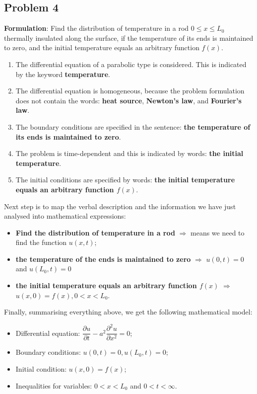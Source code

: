 \subsection{Problem 4}

{\bfseries Formulation}: Find the distribution of temperature in a rod $0\leq x\leq L_{0}$ thermally insulated along the surface, if the temperature of its ends is maintained to zero, and the initial temperature equals an arbitrary function $f(x)$.
\begin{enumerate}
\item The differential equation of a parabolic type is considered. This is indicated by the keyword {\bfseries temperature}.
\item The differential equation is homogeneous, because the problem formulation does not contain the words: {\bfseries heat source}, {\bfseries Newton's law}, and {\bfseries Fourier's law}.
\item The boundary conditions are specified in the sentence: {\bfseries the temperature of its ends is maintained to zero}.
\item The problem is time-dependent and this is indicated by words: {\bfseries the initial temperature}.
\item The initial conditions are specified by words: {\bfseries the initial temperature equals an arbitrary function $f(x)$}.
\end{enumerate}
Next step is to map the verbal description and the information we have just analysed into mathematical expressions:
\begin{itemize}
\item {\bfseries Find the distribution of temperature in a rod} $\Longrightarrow$ means we need to find the function $u(x,t)$;
\item {\bfseries the temperature of the ends is maintained to zero} $\Longrightarrow$ $u(0,t)=0$ and $u(L_{0},t)=0$
\item {\bfseries the initial temperature equals an arbitrary function $f(x)$} $\Longrightarrow$ $u(x,0)=f(x), 0<x<L_{0}$.
\end{itemize}
Finally, summarising everything above, we get the following mathematical model:
\begin{itemize}
\item Differential equation: $\dfrac{\partial u}{\partial t} - a^{2}\dfrac{\partial^{2} u}{\partial x^{2}}=0$;
\item Boundary conditions: $u(0,t)=0, u(L_{0},t)=0$;
\item Initial condition: $u(x,0)=f(x)$;
\item Inequalities for variables: $0<x<L_{0}$ and $0<t<\infty$.
\end{itemize}

